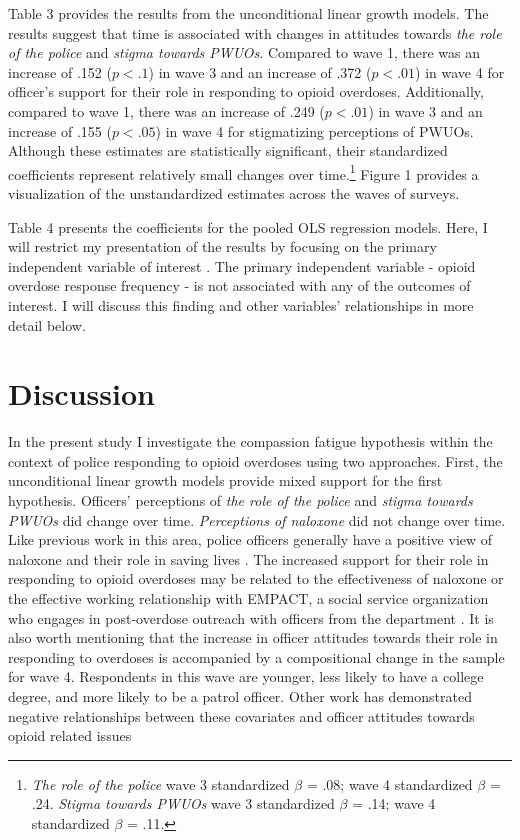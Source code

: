 Table 3 provides the results from the unconditional linear growth models. The results suggest that time is associated with changes in attitudes towards \textit{the role of the police} and \textit{stigma towards PWUOs}. Compared to wave 1, there was an increase of .152 (\(p < .1\)) in wave 3 and an increase of .372 (\(p < .01\)) in wave 4 for officer's support for their role in responding to opioid overdoses. Additionally, compared to wave 1, there was an increase of .249 (\(p < .01\)) in wave 3 and an increase of .155 (\(p < .05\)) in wave 4 for stigmatizing perceptions of PWUOs. Although these estimates are statistically significant, their standardized coefficients represent relatively small changes over time.\footnote{\textit{The role of the police} wave 3 standardized \(\beta\) = .08; wave 4 standardized \(\beta\) = .24. \textit{Stigma towards PWUOs} wave 3 standardized \(\beta\) = .14; wave 4 standardized \(\beta\) = .11.} Figure 1 provides a visualization of the unstandardized estimates across the waves of surveys. 

Table 4 presents the coefficients for the pooled OLS regression models. Here, I will restrict my presentation of the results by focusing on the primary independent variable of interest \parencite{keele_causal_2020}. The primary independent variable - opioid overdose response frequency - is not associated with any of the outcomes of interest. I will discuss this finding and other variables' relationships in more detail below. 

\section{Discussion}

In the present study I investigate the compassion fatigue hypothesis within the context of police responding to opioid overdoses using two approaches. First, the unconditional linear growth models provide mixed support for the first hypothesis. Officers' perceptions of \textit{the role of the police} and \textit{stigma towards PWUOs} did change over time. \textit{Perceptions of naloxone} did not change over time. Like previous work in this area, police officers generally have a positive view of naloxone and their role in saving lives \parencite{white_narcan_2021, pourtaher_naloxone_2022, reichert_police_2023}. The increased support for their role in responding to opioid overdoses may be related to the effectiveness of naloxone \parencite{white_leveraging_2022} or the effective working relationship with EMPACT, a social service organization who engages in post-overdose outreach with officers from the department \parencite{white_moving_2021}. It is also worth mentioning that the increase in officer attitudes towards their role in responding to overdoses is accompanied by a compositional change in the sample for wave 4. Respondents in this wave are younger, less likely to have a college degree, and more likely to be a patrol officer. Other work has demonstrated negative relationships between these covariates and officer attitudes towards opioid related issues \parencite{reichert_police_2023}

